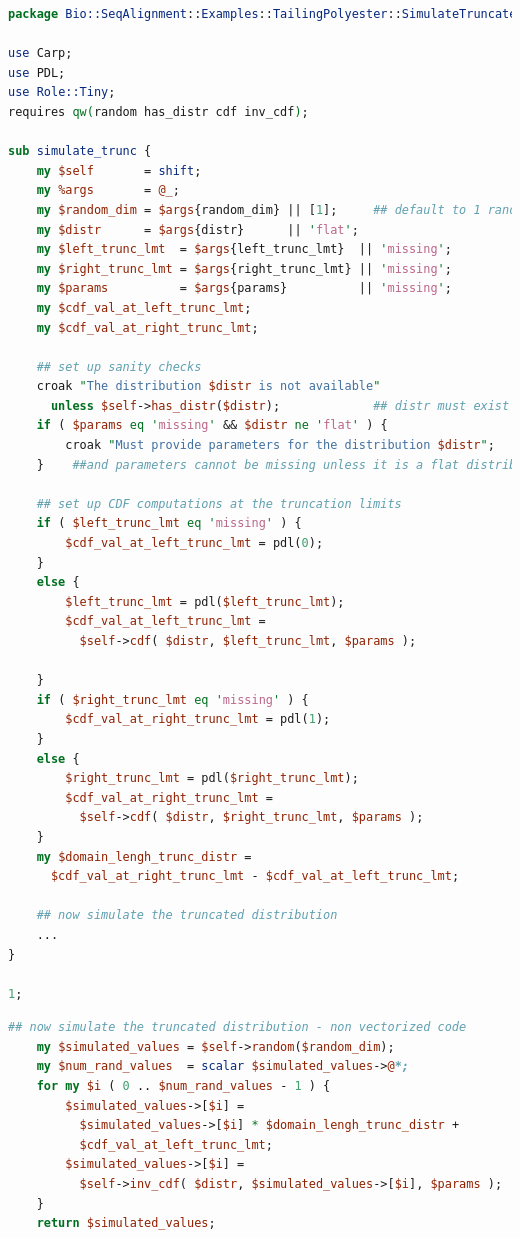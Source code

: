 \documentclass[10pt]{article}
\begin{document}
\begin{appendices}
\begin{lstlisting}[language=Perl,basicstyle=\footnotesize,frame=single,caption={An API for the Inverse CDF method.},label={lst:RNGSimulator},captionpos=b]
package Bio::SeqAlignment::Examples::TailingPolyester::SimulateTruncatedRNGPDL;

use Carp;
use PDL;
use Role::Tiny;
requires qw(random has_distr cdf inv_cdf);

sub simulate_trunc {
    my $self       = shift;
    my %args       = @_;
    my $random_dim = $args{random_dim} || [1];     ## default to 1 random number
    my $distr      = $args{distr}      || 'flat';
    my $left_trunc_lmt  = $args{left_trunc_lmt}  || 'missing';
    my $right_trunc_lmt = $args{right_trunc_lmt} || 'missing';
    my $params          = $args{params}          || 'missing';
    my $cdf_val_at_left_trunc_lmt;
    my $cdf_val_at_right_trunc_lmt;

    ## set up sanity checks
    croak "The distribution $distr is not available"
      unless $self->has_distr($distr);             ## distr must exist
    if ( $params eq 'missing' && $distr ne 'flat' ) {
        croak "Must provide parameters for the distribution $distr";
    }    ##and parameters cannot be missing unless it is a flat distribution

    ## set up CDF computations at the truncation limits
    if ( $left_trunc_lmt eq 'missing' ) {
        $cdf_val_at_left_trunc_lmt = pdl(0);
    }
    else {
        $left_trunc_lmt = pdl($left_trunc_lmt);
        $cdf_val_at_left_trunc_lmt =
          $self->cdf( $distr, $left_trunc_lmt, $params );

    }
    if ( $right_trunc_lmt eq 'missing' ) {
        $cdf_val_at_right_trunc_lmt = pdl(1);
    }
    else {
        $right_trunc_lmt = pdl($right_trunc_lmt);
        $cdf_val_at_right_trunc_lmt =
          $self->cdf( $distr, $right_trunc_lmt, $params );
    }
    my $domain_lengh_trunc_distr =
      $cdf_val_at_right_trunc_lmt - $cdf_val_at_left_trunc_lmt;

    ## now simulate the truncated distribution
    ...
}

1;
\end{lstlisting}
\newpage
\begin{lstlisting}[language=Perl,basicstyle=\footnotesize,frame=single,caption={The inverse CDF calculations in base Perl.},label={lst:InvCDFWithPDL2},captionpos=b]
    ## now simulate the truncated distribution - non vectorized code
    my $simulated_values = $self->random($random_dim);
    my $num_rand_values  = scalar $simulated_values->@*;
    for my $i ( 0 .. $num_rand_values - 1 ) {
        $simulated_values->[$i] =
          $simulated_values->[$i] * $domain_lengh_trunc_distr +
          $cdf_val_at_left_trunc_lmt;
        $simulated_values->[$i] =
          $self->inv_cdf( $distr, $simulated_values->[$i], $params );
    }
    return $simulated_values;
\end{lstlisting}


\end{appendices}
\end{document}

